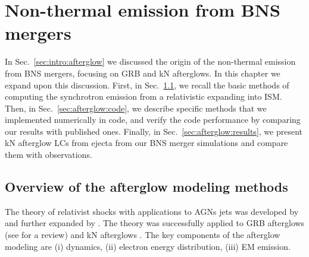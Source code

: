 
\chapter{Non-thermal emission from \ac{BNS} mergers} \label{ch:afterglow} 


In Sec.~\ref{sec:intro:afterglow} we discussed the origin of 
the non-thermal emission from \ac{BNS} mergers, focusing on 
\ac{GRB} and \ac{kN} afterglows. 
%
In this chapter we expand upon this discussion. First, in 
Sec.~\ref{sec:intro:afterglow_modelling}, we recall the basic methods 
of computing the synchrotron emission from a relativistic \blast{} 
expanding into \ac{ISM}. 
%
Then, in Sec.~\ref{sec:afterglow:code}, we describe specific methods 
that we implemented numerically in \pyblast{} code, and verify the 
code performance by comparing our results with published ones. 
%
Finally, in Sec.~\ref{sec:afterglow:results}, we present 
\ac{kN} afterglow \acp{LC} from ejecta from our \ac{BNS} merger 
simulations and compare them with observations. 



\section{Overview of the afterglow modeling methods}\label{sec:intro:afterglow_modelling}

The theory of relativist shocks with applications to \acp{AGN} jets was 
developed by \citet{Blandford:1976} 
and further expanded by \citep{vanEerten:2011bf,Nava:2013,Peer:2012}. 
The theory was successfully applied to \ac{GRB} afterglows 
\citep[\eg][]{Costa:1997cg,vanParadijs:1997wr,Lamb:2017ych}
(see \citet{Kumar:2014upa} for a review) 
and \ac{kN} afterglows \citep[\eg][]{Nakar:2011cw,Hotokezaka:2015eja,Hotokezaka:2018gmo}.
%
%
%
The key components of the afterglow modeling are (i) \blast{} dynamics, 
(ii) electron energy distribution, (iii) \ac{EM} emission. 



